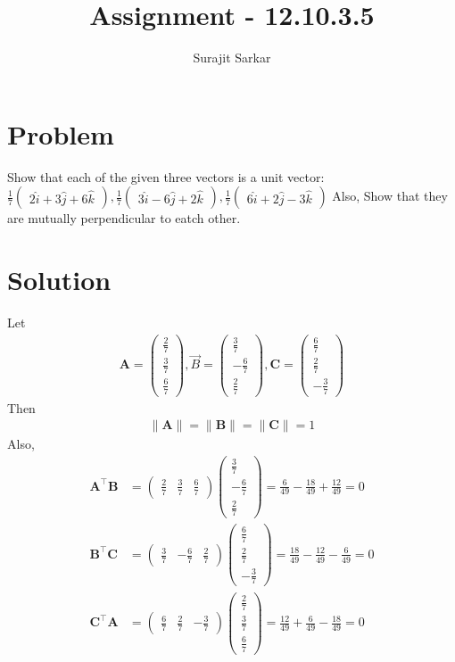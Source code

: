 \documentclass[journal,12pt,twocolumn]{IEEEtran}
\title{\mytitle}
\title{
Assignment - 12.10.3.5
}
\author{Surajit Sarkar}
\newcommand{\myvec}[1]{\ensuremath{\begin{pmatrix}#1\end{pmatrix}}}
\providecommand{\norm}[1]{\lVert#1\rVert}
\let\vec\mathbf
\begin{document}
\maketitle
\tableofcontents
\bigskip
\section{\textbf{Problem}}
Show that each of the given three vectors is a unit vector:$\frac{1}{7}\myvec{2\hat{i}+3\hat{j}+6\hat{k}},\frac{1}{7}\myvec{3\hat{i}-6\hat{j}+2\hat{k}},\frac{1}{7}\myvec{6\hat{i}+2\hat{j}-3\hat{k}}$
Also, Show that they are mutually perpendicular to eatch other.
\section{\textbf{Solution}}
\fi
Let
\begin{align}
\vec{A}=\myvec{\frac{2}{7}\\ \frac{3}{7}\\ \frac{6}{7}},\Vec{B}=\myvec{\frac{3}{7}\\ -\frac{6}{7}\\ \frac{2}{7}},\vec{C}=\myvec{\frac{6}{7}\\ \frac{2}{7}\\ -\frac{3}{7}}
\end{align}
Then
\begin{align}
	\norm{\vec{A}}
=
\norm{\vec{B}}
=
\norm{\vec{C}}
=1
\end{align}
Also,
\begin{align}
\vec{A}^{\top}\vec{B}&=\myvec{\frac{2}{7}&\frac{3}{7}&\frac{6}{7}}\myvec{\frac{3}{7}\\-\frac{6}{7}\\ \frac{2}{7}}
=\frac{6}{49}-\frac{18}{49}+\frac{12}{49}
=0
\\
\vec{B}^{\top}\vec{C}&=\myvec{\frac{3}{7}&-\frac{6}{7}&\frac{2}{7}}\myvec{\frac{6}{7}\\ \frac{2}{7}\\-\frac{3}{7}}
=\frac{18}{49}-\frac{12}{49}-\frac{6}{49}
=0
\\
\vec{C}^{\top}\vec{A}&=\myvec{\frac{6}{7}&\frac{2}{7}&-\frac{3}{7}}\myvec{\frac{2}{7}\\ \frac{3}{7}\\ \frac{6}{7}}
=\frac{12}{49}+\frac{6}{49}-\frac{18}{49}
=0
\end{align}
\end{document}
